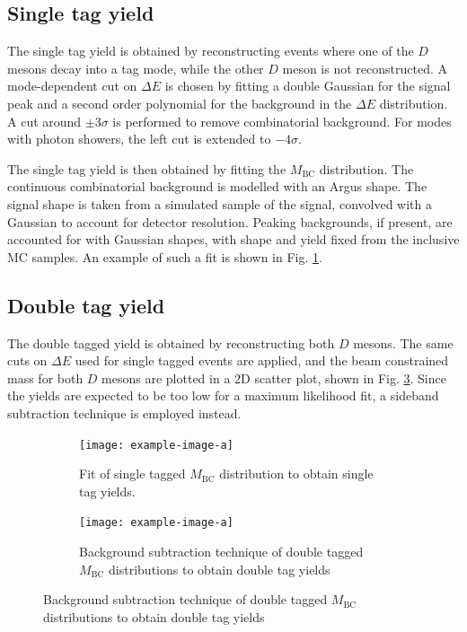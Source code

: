 \documentclass[12pt, a4paper, notitlepage, onecolumn]{article}
\numberwithin{equation}{section}
\begin{document}
\subsection{Single tag yield}
\noindent The single tag yield is obtained by reconstructing events where one of the $D$ mesons decay into a tag mode, while the other $D$ meson is not reconstructed. A mode-dependent cut on $\Delta E$ is chosen by fitting a double Gaussian for the signal peak and a second order polynomial for the background in the $\Delta E$ distribution. A cut around $\pm 3\sigma$ is performed to remove combinatorial background. For modes with photon showers, the left cut is extended to $-4\sigma$.

The single tag yield is then obtained by fitting the $M_\text{BC}$ distribution. The continuous combinatorial background is modelled with an Argus shape. The signal shape is taken from a simulated sample of the signal, convolved with a Gaussian to account for detector resolution. Peaking backgrounds, if present, are accounted for with Gaussian shapes, with shape and yield fixed from the inclusive MC samples. An example of such a fit is shown in Fig. \ref{fig_styield}.

\subsection{Double tag yield}
\noindent The double tagged yield is obtained by reconstructing both $D$ mesons. The same cuts on $\Delta E$ used for single tagged events are applied, and the beam constrained mass for both $D$ mesons are plotted in a $2$D scatter plot, shown in Fig. \ref{fig_dtyield}. Since the yields are expected to be too low for a maximum likelihood fit, a sideband subtraction technique is employed instead.

\begin{figure}[H] 
  \centering
  \begin{subfigure}{0.5\textwidth}
    \centering
    \texttt{[image: example-image-a]}
    \caption{Fit of single tagged $M_\text{BC}$ distribution to obtain single tag yields.}
    \label{fig_styield}
  \end{subfigure}%
  \begin{subfigure}{0.5\textwidth}
    \centering
    \texttt{[image: example-image-a]}
  \caption{Background subtraction technique of double tagged $M_\text{BC}$ distributions to obtain double tag yields}
    \label{fig_dtyield}
  \end{subfigure}
\end{figure}
\end{document}
